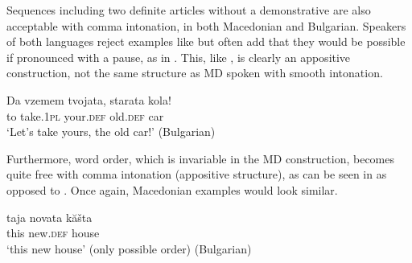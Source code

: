 \documentclass[output=paper,
colorlinks,
citecolor=brown,
newtxmath
]{langscibook}
\begin{document}
\noindent Sequences including two definite articles without a demonstrative are also acceptable with comma intonation, in both Macedonian and Bulgarian. Speakers of both languages reject examples like  but often add that they would be possible if pronounced with a pause, as in . This, like , is clearly an appositive construction, not the same structure as MD spoken with smooth intonation.


\z
\ea \label{yours2}
\gll Da vzemem tvojata, starata kola!\\
    to take.\textsc{1pl} your.\textsc{def} old.\textsc{def} car\\
\glt `Let's take yours, the old car!' \hfill (Bulgarian)
\z

\noindent Furthermore, word order, which is invariable in the MD construction, becomes quite free with comma intonation (appositive structure), as can be seen in  as opposed to . Once again, Macedonian examples would look similar.

\ea \label{house}
\gll taja novata kăšta\\
this new.\textsc{def} house\\
\glt `this new house’ 	(only possible order) \hfill(Bulgarian)
\z

\end{document}
